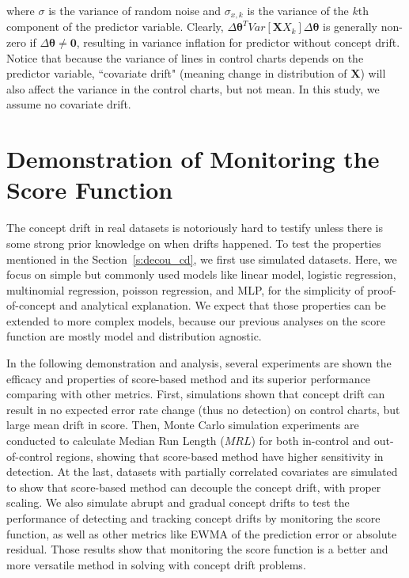 \documentclass[twoside,11pt]{article}
\begin{document}
where $ \sigma$ is the variance of random noise and $ \sigma _{x,k}$ is the variance of the $k$th component of the predictor variable. Clearly, $\Delta \bm{\theta}^TVar [\bm {X}  X_{k}]\Delta \bm{\theta}$ is generally non-zero if $ \Delta \bm { \theta} \neq \bm {0}$, resulting in variance inflation for predictor without concept drift. Notice that because the variance of lines in control charts depends on the predictor variable, ``covariate drift" (meaning change in distribution of $\bm {X}$) will also affect the variance in the control charts, but not mean. In this study, we assume no covariate drift.

\section{Demonstration of Monitoring the Score Function}
The concept drift in real datasets is notoriously hard to testify unless there is some strong prior knowledge on when drifts happened. To test the properties mentioned in the Section~\ref{s:decou_cd}, we first use simulated datasets. Here, we focus on simple but commonly used models like linear model, logistic regression, multinomial regression, poisson regression, and MLP, for the simplicity of proof-of-concept and analytical explanation. We expect that those properties can be extended to more complex models, because our previous analyses on the score function are mostly model and distribution agnostic. 

In the following demonstration and analysis, several experiments are shown the efficacy and properties of score-based method and its superior performance comparing with other metrics. First, simulations shown that concept drift can result in no expected error rate change (thus no detection) on control charts, but large mean drift in score. Then, Monte Carlo simulation experiments are conducted to calculate Median Run Length ($MRL$) for both in-control and out-of-control regions, showing that score-based method have higher sensitivity in detection. At the last, datasets with partially correlated covariates are simulated to show that score-based method can decouple the concept drift, with proper scaling.
We also simulate abrupt and gradual concept drifts to test the performance of detecting and tracking concept drifts by monitoring the score function, as well as other metrics like EWMA of the prediction error or absolute residual. Those results show that monitoring the score function is a better and more versatile method in solving with concept drift problems. 
\end{document}
